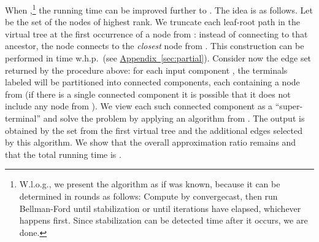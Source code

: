 \documentclass[letterpaper,11pt]{article}
\newcommand{\namedref}[2]{\hyperref[#2]{#1~\ref*{#2}}}
\newcommand{\appendixref}[1]{\namedref{Appendix}{#1}}
\begin{document}
When ,\footnote{W.l.o.g., we present the algorithm as if  was known, because it
  can be determined in  rounds as follows:
  Compute  by convergecast, then run Bellman-Ford until
  stabilization or until  iterations have elapsed, whichever
  happens first. Since stabilization can be detected  time
  after it occurs, we are done.
} 
the running time can be improved further to . The idea is as
follows. Let  be the set of the  nodes of highest rank.
We truncate each leaf-root path in the virtual tree at the first occurrence of a
node from : instead of connecting to that ancestor, the node 
connects to the \emph{closest} node from . This construction can be
performed in time  w.h.p.\ (see \appendixref{sec:partial}).
Consider now the edge set  returned by the procedure above: for each input
component , the terminals labeled  will be partitioned
into connected components, each containing a node from  (if there is a
single connected component it is possible that it does not include any node from
). We view each such connected component as a ``super-terminal'' and
solve the problem by applying an algorithm from \cite{LenzenP13}. The output is
obtained by the set  from the first virtual tree and the additional edges
selected by this algorithm. We show that the overall approximation ratio remains
 and that the total running time is
.
\end{document}
